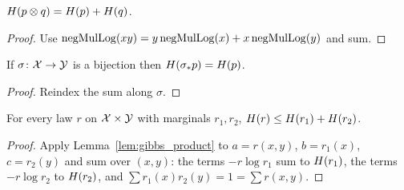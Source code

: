 \begin{lemma}
  \label{lem:entropy_prod}
  \leanok
  $H(p \otimes q) = H(p) + H(q)$.
\end{lemma}
\begin{proof}
  \leanok
  Use $\operatorname{negMulLog}(xy) = y \operatorname{negMulLog}(x) + x \operatorname{negMulLog}(y)$ and sum.
\end{proof}

\begin{lemma}
  \label{lem:entropy_map_equiv}
  \leanok
  If $\sigma \colon \mathcal X \to \mathcal Y$ is a bijection then $H(\sigma_* p) = H(p)$.
\end{lemma}
\begin{proof}
  \leanok
  Reindex the sum along $\sigma$.
\end{proof}

\begin{theorem}
  \label{thm:entropy_subadditive}
  \leanok
  For every law $r$ on $\mathcal X \times \mathcal Y$ with marginals $r_1, r_2$,
  $H(r) \le H(r_1) + H(r_2)$.
\end{theorem}
\begin{proof}
  \leanok
  Apply Lemma~\ref{lem:gibbs_product} to $a = r(x, y)$, $b = r_1(x)$, $c = r_2(y)$ and sum over
  $(x, y)$: the terms $-r \log r_1$ sum to $H(r_1)$, the terms $-r \log r_2$ to $H(r_2)$,
  and $\sum r_1(x) r_2(y) = 1 = \sum r(x, y)$.
\end{proof}
